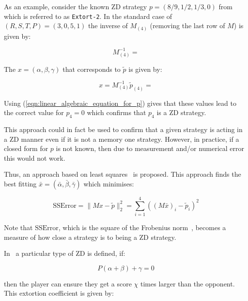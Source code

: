 \documentclass[a4paper]{article}
\begin{document}
As an example, consider the known ZD strategy \(p=(8 / 9, 1 / 2, 1 / 3, 0)\)
from~\cite{Stewart2012} which is referred to as \texttt{Extort-2}. In the
standard case of \((R, S, T, P)=(3, 0, 5, 1)\) the inverse
of \(M_{(4)}\) (removing the last row of \(M\)) is given by:

\begin{equation}\label{eqn:inverse_of_M4}
    M_{(4)}^{-1} =
    
\end{equation}

The \(x=(\alpha, \beta, \gamma)\) that corresponds to
\(\tilde p\) is given by:

\begin{equation}\label{eqn:alpha_beta_gamma_for_extort_2}
    x = M_{(4)}^{-1}\tilde p_{(4)} =
    
\end{equation}

Using (\ref{eqn:linear_algebraic_equation_for_p}) gives that these values lead
to the correct value for \(p_4=0\) which confirms that \(p_4\) is a ZD strategy.

This approach could in fact be used to confirm that a given strategy is acting
in a ZD manner even if it is not a memory one strategy. However, in practice, if
a closed form for \(p\) is not known, then due to measurement and/or numerical
error this would not work.

Thus, an approach based on least squares~\cite{Golub2013} is proposed. This
approach finds the best fitting \(\bar x=(\bar\alpha, \bar\beta,
\bar\gamma)\) which minimises:

\begin{equation}\label{eqn:r_squared}
    \text{SSError} = \|M x-\tilde p\|_2^2 = \sum_{i=1}^{4}\left((M\bar x)_i-\tilde p_i\right)^2
\end{equation}

Note that \(\text{SSError}\), which is the square of the Frobenius
norm~\cite{Golub2013}, becomes a measure of how close a strategy is to being a ZD
strategy.

In~\cite{Press2012} a particular type of ZD is defined, if:

\begin{equation}\label{eqn:constraint_for_extortion}
    P(\alpha + \beta)+\gamma=0
\end{equation}

then the player can ensure they get a score \(\chi\) times
larger than the opponent. This extortion coefficient is given by:
\end{document}
